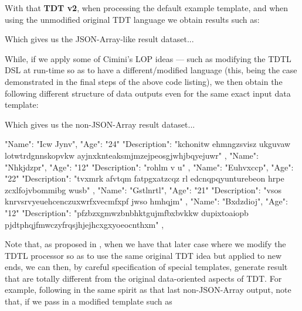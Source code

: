 \documentclass[a4paper, 18pt]{book} %
\begin{document}
With that \textbf{TDT v2}, when processing the default example template, and when using the unmodified original TDT language we obtain results such as:


\vspace{2em}
 
 Which gives us the JSON-Array-like result dataset...
 
     \begin{tcbverbatim}
  \end{tcbverbatim} 
 

 
 While, if we apply some of Cimini's LOP ideas --- such as modifying the TDTL DSL at run-time so as to have a different/modified language (this, being the case demonstrated in the final steps of the above code listing), we then obtain the following different structure of data outputs even for the same exact input data template:
 
 
 Which gives us the non-JSON-Array result dataset...
  
     \begin{tcbverbatim}[title=Example of Output TDTL Unmodified]


 { "Name": "Icw Jynv", "Age": "24" "Description": "kchonitw ehmngzsvisz ukguvaw lotwtrdgnnskopvkw ayjnxknteaksmjmzejpeosgjwhjbqyejuwr" }, 
 { "Name": "Nhkjdzpr", "Age": "12" "Description": "rohlm v u" }, 
 { "Name": "Euhvxccp", "Age": "22" "Description": "tvxmrk afvtqm fatpgxatzcqz rl edcnqpqyunturebeon hrpe zcxlfojvbommibg wusb" }, 
 { "Name": "Gstlnrtl", "Age": "21" "Description": "vsos knrvsrvyeuehcenczuxwrfxvecmfxpf jwso hmhqjm" }, 
 { "Name": "Bxdzdioj", "Age": "12" "Description": "pfzbzxgmwzbnbhktgujmfbxbvkkw dupixtoaiopb pjdtphqjfmwczyfrqsjhjejhcxgxyoeocnthxm" }, 

  \end{tcbverbatim} 
 
 
 \vspace{2em}
 
 Note that, as proposed in \cite{lutalo_2026_acmsle_reviewbook}, when we have that later case where we modify the TDTL processor so as to use the same original TDT idea but applied to new ends, we can then, by careful specification of special templates, generate result that are totally different from the original data-oriented aspects of TDT. For example, following in the same spirit as that last non-JSON-Array output, note that, if we pass in a modified template such as 
 
\end{document}
